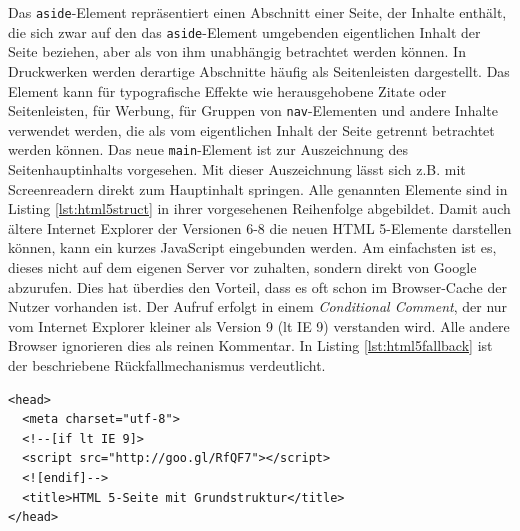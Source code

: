 Das \texttt{aside}-Element repräsentiert einen Abschnitt einer Seite, der Inhalte enthält, die sich zwar auf den das \texttt{aside}-Element umgebenden eigentlichen Inhalt der Seite beziehen, aber als von ihm unabhängig betrachtet werden können. In Druckwerken werden derartige Abschnitte häufig als Seitenleisten dargestellt. Das Element kann für typografische Effekte wie herausgehobene Zitate oder Seitenleisten, für Werbung, für Gruppen von \texttt{nav}-Elementen und andere Inhalte verwendet werden, die als vom eigentlichen Inhalt der Seite getrennt betrachtet werden können.\grqq{}\cite[S.43]{PilgDurc2011} Das neue \texttt{main}-Element ist zur Auszeichnung des Seitenhauptinhalts vorgesehen. Mit dieser Auszeichnung lässt sich z.B. mit Screenreadern direkt zum Hauptinhalt springen.  Alle genannten Elemente sind in Listing \ref{lst:html5struct} in ihrer vorgesehenen Reihenfolge abgebildet. \glqq Damit auch ältere Internet Explorer der Versionen 6-8 die neuen HTML 5-Elemente darstellen können, kann ein kurzes JavaScript eingebunden werden. Am einfachsten ist es, dieses nicht auf dem eigenen Server vor zuhalten, sondern direkt von Google abzurufen. Dies hat überdies den Vorteil, dass es oft schon im Browser-Cache der Nutzer vorhanden ist. Der Aufruf erfolgt in einem \textit{Conditional Comment}, der nur vom Internet Explorer kleiner als Version 9 (lt IE 9) verstanden wird. Alle andere Browser ignorieren dies als reinen Kommentar.\grqq{}\cite{SelfHtml20143} In Listing \ref{lst:html5fallback}	 ist der beschriebene Rückfallmechanismus verdeutlicht.

\vspace{1em}
\begin{lstlisting}[language=HTML5, caption=HTML 5 Internet Explorer Fallback, label=lst:html5fallback]
<head>
  <meta charset="utf-8">
  <!--[if lt IE 9]>
  <script src="http://goo.gl/RfQF7"></script>
  <![endif]-->
  <title>HTML 5-Seite mit Grundstruktur</title>
</head>
\end{lstlisting}
	
